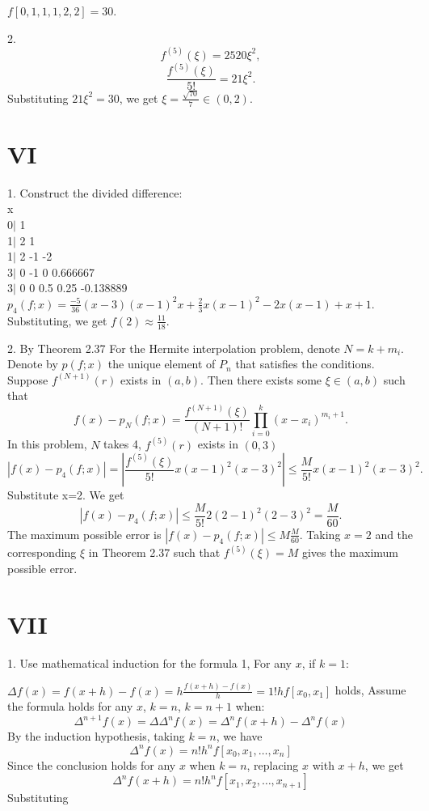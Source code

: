\documentclass[a4paper]{article}
\begin{document}
\( f[0, 1, 1, 1, 2, 2] = 30 \).

2.
\[
f^{(5)}(\xi) = 2520 \xi^2,
\]
\[
\frac{f^{(5)}(\xi)}{5!} = 21 \xi^2.
\]
Substituting \( 21 \xi^2 = 30 \), we get \( \xi = \frac{\sqrt{70}}{7} \in (0,2) \).

\section*{VI}
1.
Construct the divided difference:\\
  x\\
  0$|$ 1\\
  1$|$ 2 1\\
  1$|$ 2 -1 -2\\
  3$|$ 0 -1 0   0.666667\\
  3$|$ 0 0  0.5 0.25 -0.138889\\
\( p_4(f; x) = \frac{-5}{36}(x-3)(x-1)^2x + \frac{2}{3}x(x-1)^2 - 2x(x-1) + x + 
1 \).\\
Substituting, we get \( f(2) \approx \frac{11}{18} \).

2.
By Theorem 2.37
For the Hermite interpolation problem, denote \( N = k + m_i \). Denote by \( p(f; x) \) the unique element of \( P_n \) that satisfies the conditions. Suppose \( f^{(N+1)}(r) \) exists in \( (a, b) \). Then there exists some \( \xi \in (a, b) \) such that
\[
f(x) - p_N(f; x) = \frac{f^{(N+1)}(\xi)}{(N+1)!} \prod_{i=0}^k (x - x_i)^{m_i + 1}.
\]
In this problem, \( N \) takes 4, \( f^{(5)}(r) \) exists in \( (0, 3) \)
\[
|f(x) - p_4(f; x)| = \left| \frac{f^{(5)}(\xi)}{5!} x (x - 1)^2 (x-3)^2 \right| \leq \frac{M}{5!} x (x - 1)^2 (x-3)^2.
\]
Substitute x=2. We get 
\[
|f(x) - p_4(f; x)|  \leq \frac{M}{5!} 2 (2 - 1)^2 (2-3)^2=\frac{M}{60}.
\]
The maximum possible error is \( |f(x) - p_4(f; x)| \leq M \frac{M}{60} \). Taking \( x = 2 \) and the corresponding \( \xi \) in Theorem 2.37 such that \( f^{(5)}(\xi) = M \) gives the maximum possible error.

\section*{VII}
1. Use mathematical induction for the formula 1,
For any \( x \), if \( k = 1 \):

\(\Delta f(x) = f(x+h) - f(x) = h \frac{f(x+h) - f(x)}{h} = 1! h f[x_0, x_1] \) holds,
Assume the formula holds for any \( x \), \( k = n \), \( k = n + 1 \) when:
\[
\Delta^{n+1} f(x) = \Delta \Delta^n f(x) = \Delta^n f(x+h) - \Delta^n f(x)
\]
By the induction hypothesis, taking \( k = n \), we have
\[
\Delta^n f(x) = n! h^n f[x_0, x_1, \ldots, x_n]
\]
Since the conclusion holds for any \( x \) when \( k = n \), replacing \( x \) with \( x + h \), we get
\[
\Delta^n f(x+h) = n! h^n f[x_1, x_2, \ldots, x_{n+1}]
\]
Substituting
\end{document}
